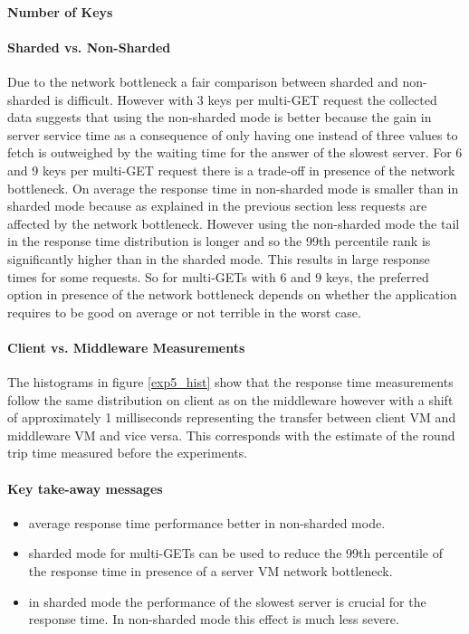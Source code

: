 \documentclass[report.tex]{subfiles}
\begin{document}
\paragraph{Number of Keys}

\paragraph{Sharded vs. Non-Sharded}
Due to the network bottleneck a fair comparison between sharded and non-sharded is difficult. 
However with 3 keys per multi-GET request the collected data suggests that using the non-sharded mode is better because the gain in server service time as a consequence of only having one instead of three values to fetch is outweighed by the waiting time for the answer of the slowest server. For 6 and 9 keys per multi-GET request there is a trade-off in presence of the network bottleneck. On average the response time in non-sharded mode is smaller than in sharded mode because as explained in the previous section less requests are affected by the network bottleneck. However using the non-sharded mode the tail in the response time distribution is longer and so the 99th percentile rank is significantly higher than in the sharded mode. This results in large response times for some requests.
So for multi-GETs with 6 and 9 keys, the preferred option in presence of the network bottleneck depends on whether the application requires to be good on average or not terrible in the worst case. 

\paragraph{Client vs. Middleware Measurements}
The histograms in figure \ref{exp5_hist} show that the response time measurements follow the same distribution on client as on the middleware however with a shift of approximately 1 milliseconds representing the transfer between client VM and middleware VM and vice versa. This corresponds with the estimate of the round trip time measured before the experiments. 

\paragraph{Key take-away messages}
\begin{itemize}
	\item average response time performance better in non-sharded mode.
	\item sharded mode for multi-GETs can be used to reduce the 99th percentile of the response time in presence of a server VM network bottleneck.
	\item in sharded mode the performance of the slowest server is crucial for the response time. In non-sharded mode this effect is much less severe.
\end{itemize}
\end{document}
